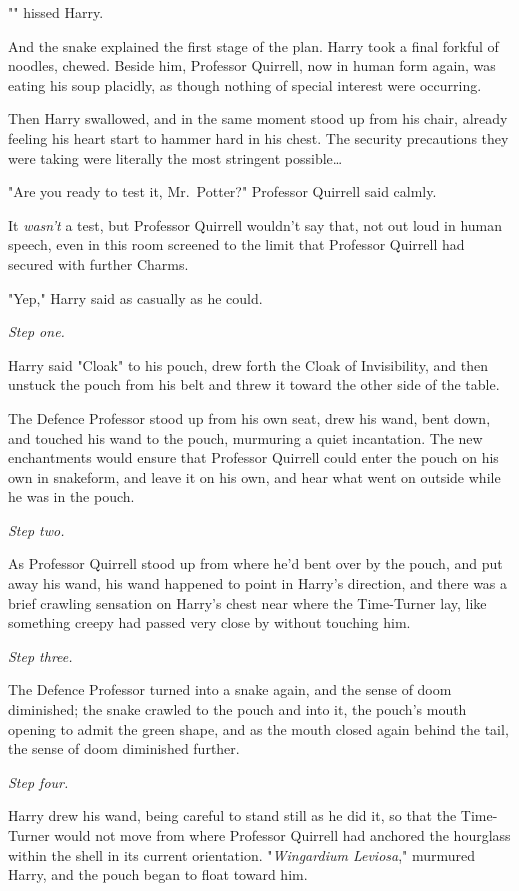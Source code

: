 "" hissed Harry.

And the snake explained the first stage of the plan.
\later
Harry took a final forkful of noodles, chewed. Beside him, Professor Quirrell,
now in human form again, was eating his soup placidly, as though nothing of
special interest were occurring.

Then Harry swallowed, and in the same moment stood up from his chair, already
feeling his heart start to hammer hard in his chest. The security precautions
they were taking were literally the most stringent possible{\ldots}

"Are you ready to test it, Mr.~Potter?" Professor Quirrell said calmly.

It \emph{wasn't} a test, but Professor Quirrell wouldn't say that, not out loud
in human speech, even in this room screened to the limit that Professor
Quirrell had secured with further Charms.

"Yep," Harry said as casually as he could.

\emph{Step one.}

Harry said "Cloak" to his pouch, drew forth the Cloak of Invisibility, and then
unstuck the pouch from his belt and threw it toward the other side of the table.

The Defence Professor stood up from his own seat, drew his wand, bent down, and
touched his wand to the pouch, murmuring a quiet incantation. The new
enchantments would ensure that Professor Quirrell could enter the pouch on his
own in snakeform, and leave it on his own, and hear what went on outside while
he was in the pouch.

\emph{Step two.}

As Professor Quirrell stood up from where he'd bent over by the pouch, and put
away his wand, his wand happened to point in Harry's direction, and there was a
brief crawling sensation on Harry's chest near where the Time-Turner lay, like
something creepy had passed very close by without touching him.

\emph{Step three.}

The Defence Professor turned into a snake again, and the sense of doom
diminished; the snake crawled to the pouch and into it, the pouch's mouth
opening to admit the green shape, and as the mouth closed again behind the
tail, the sense of doom diminished further.

\emph{Step four.}

Harry drew his wand, being careful to stand still as he did it, so that the
Time-Turner would not move from where Professor Quirrell had anchored the
hourglass within the shell in its current orientation. "\emph{Wingardium
Leviosa}," murmured Harry, and the pouch began to float toward him.

